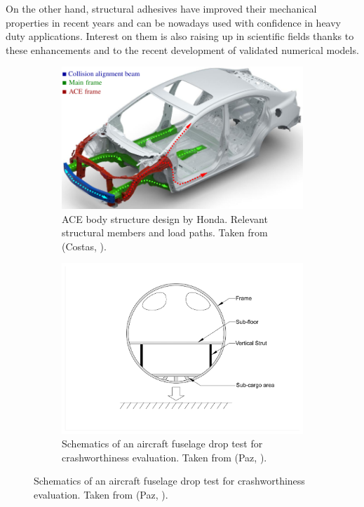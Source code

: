 \documentclass[cmfonts]{witpress}
\begin{document}
On the other hand, structural adhesives have improved their mechanical properties in recent years and can be nowadays used with confidence in heavy duty applications. Interest on them is also raising up in scientific fields thanks to these enhancements and to the recent development of validated numerical models.


\begin{figure}[htpb]
\begin{subfigure}[b]{.45\columnwidth}
   \includegraphics[width=\columnwidth]{figures/IMG/ace}
    \caption{ACE body structure design by Honda. Relevant structural members and load paths. Taken from (Costas, \cite{tesis_mcostas}).}
    \label{fig:car}
\end{subfigure}
\qquad
\begin{subfigure}[b]{.45\columnwidth}
   \includegraphics[width=\columnwidth]{figures/IMG/energy_absorption2}
    \caption{Schematics of an aircraft fuselage drop test for crashworthiness evaluation. Taken from (Paz, \cite{Paz:2014dw}).}
    \label{fig:plane}
\end{subfigure}
\label{fig:car_plane}
\end{figure}
\end{document}

